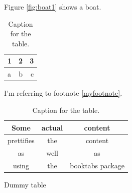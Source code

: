 \documentclass{article}
\begin{document}
  Figure \ref{fig:boat1} shows a boat.

  \begin{table}[h!]
    \centering
    \caption{Caption for the table.}
    \label{tab:table1}
    \begin{tabular}{l|c||r}
      1 & 2 & 3\\
      \hline
      a & b & c\\
    \end{tabular}
  \end{table}

  I'm referring to footnote \ref{myfootnote}.

  \begin{table}[h!]
    \centering
    \caption{Caption for the table.}
    \label{tab:table2}
    \begin{tabular}{ccc}
      \toprule
      Some & actual & content\\
      \midrule
      prettifies & the & content\\
      as & well & as\\
      using & the & booktabs package\\
      \bottomrule
    \end{tabular}
  \end{table}

  \newpage
  \begin{table}
    \caption{Dummy table}
  \end{table}

  \begin{appendix}
    \listoffigures
    \listoftables
  \end{appendix}
\end{document}
